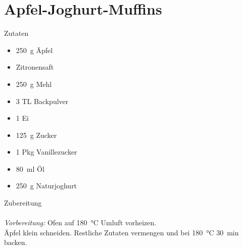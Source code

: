\section*{Apfel-Joghurt-Muffins}
\ihead{}\ohead{}
\cfoot{}
{\Large Zutaten}
\begin{multicols}{2}
\begin{itemize}
    \item \SI{250}{g} Äpfel
    \item Zitronensaft
    \item \SI{250}{g} Mehl
    \item \num{3} TL Backpulver
    \item \num{1} Ei
    \item \SI{125}{g} Zucker
    \item \num{1} Pkg Vanillezucker
    \item \SI{80}{ml} Öl
    \item \SI{250}{g} Naturjoghurt
\end{itemize}
\end{multicols}
\noindent
{\Large Zubereitung}\\
\\
\textit{Vorbereitung:} Ofen auf \SI{180}{\celsius} Umluft vorheizen.\\
Äpfel klein schneiden.
Restliche Zutaten vermengen und bei \SI{180}{\celsius} \SI{30}{min} backen.